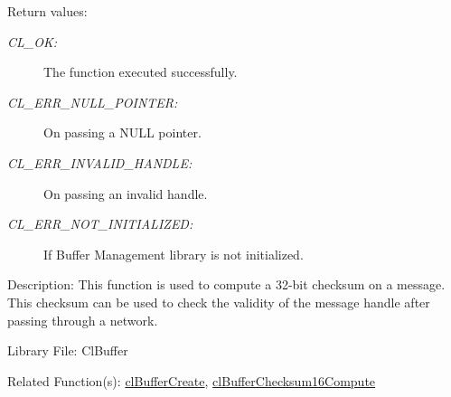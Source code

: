 \begin{Desc}
\item[Return values:]
\begin{description}
\item[{\em CL\_\-OK:}]The function executed successfully. \item[{\em CL\_\-ERR\_\-NULL\_\-POINTER:}]On passing a NULL pointer. \item[{\em CL\_\-ERR\_\-INVALID\_\-HANDLE:}]On passing an invalid handle. \item[{\em CL\_\-ERR\_\-NOT\_\-INITIALIZED:}]If Buffer Management library is not initialized.\end{description}
\end{Desc}
\begin{Desc}
\item[Description:]This function is used to compute a 32-bit checksum on a message. This checksum can be used to check the validity of the message handle after passing through a network.\end{Desc}
\begin{Desc}
\item[Library File:]Cl\-Buffer\end{Desc}
\begin{Desc}
\item[Related Function(s):]\hyperlink{pagebuf103}{cl\-Buffer\-Create}, \hyperlink{pagebuf110}{cl\-Buffer\-Checksum16Compute} \end{Desc}



\newpage
